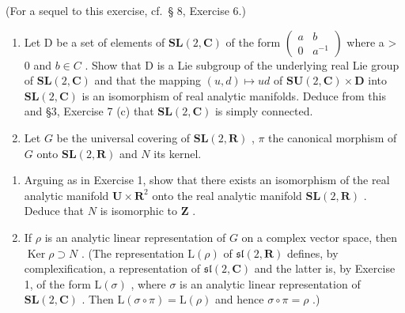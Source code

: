 (For a sequel to this exercise, cf.~§ 8, Exercise 6.)


\begin{enumerate}
\def\labelenumi{\arabic{enumi}.}
\item
  Let D be a set of elements of \(\mathbf{SL}(2,\mathbf{C})\) of the form \(\begin{pmatrix}a & b \\ 0 & a^{-1}\end{pmatrix}\) where a \textgreater{} 0 and \(b \in C\) . Show that D is a Lie subgroup of the underlying real Lie group of \(\mathbf{SL}(2,\mathbf{C})\) and that the mapping \((u,d) \mapsto ud\) of \(\mathbf{SU}(2,\mathbf{C}) \times \mathbf{D}\) into \(\mathbf{SL}(2,\mathbf{C})\) is an isomorphism of real analytic manifolds. Deduce from this and §3, Exercise 7 (c) that \(\mathbf{SL}(2,\mathbf{C})\) is simply connected.
\item
  Let \(G\) be the universal covering of \(\mathbf{SL}(2, \mathbf{R})\) , \(\pi\) the canonical morphism of \(G\) onto \(\mathbf{SL}(2, \mathbf{R})\) and \(N\) its kernel.
\end{enumerate}

\begin{enumerate}
\def\labelenumi{(\alph{enumi})}
\item
  Arguing as in Exercise 1, show that there exists an isomorphism of the real analytic manifold \(\mathbf{U} \times \mathbf{R}^2\) onto the real analytic manifold \(\mathbf{SL}(2, \mathbf{R})\) . Deduce that \(N\) is isomorphic to \(\mathbf{Z}\) .
\item
  If \(\rho\) is an analytic linear representation of \(G\) on a complex vector space, then \(\operatorname{Ker} \rho \supset N\) . (The representation \(\mathrm{L}(\rho)\) of \(\mathfrak{sl}(2, \mathbf{R})\) defines, by complexification, a representation of \(\mathfrak{sl}(2, \mathbf{C})\) and the latter is, by Exercise 1, of the form \(\mathrm{L}(\sigma)\) , where \(\sigma\) is an analytic linear representation of \(\mathbf{SL}(2, \mathbf{C})\) . Then \(\mathrm{L}(\sigma \circ \pi) = \mathrm{L}(\rho)\) and hence \(\sigma \circ \pi = \rho\) .)
\end{enumerate}

